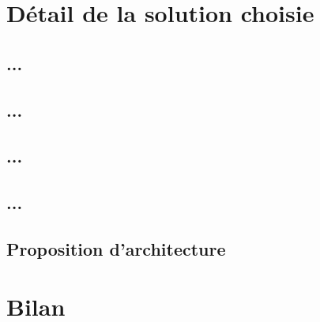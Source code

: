 \section{Détail de la solution choisie}

\subsection{...}

\subsection{...}

\subsection{...}

\subsection{...}

\subsection{Proposition d'architecture}


\section{Bilan}
